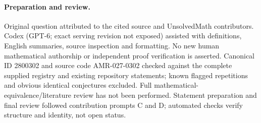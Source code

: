 \documentclass[11pt]{article}
\begin{document}
\paragraph{Preparation and review.}
Original question attributed to the cited source and UnsolvedMath contributors. Codex (GPT-6; exact serving revision not exposed) assisted with definitions, English summaries, source inspection and formatting. No new human mathematical authorship or independent proof verification is asserted. Canonical ID 2800302 and source code AMR-027-0302 checked against the complete supplied registry and existing repository statements; known flagged repetitions and obvious identical conjectures excluded. Full mathematical-equivalence/literature review has not been performed. Statement preparation and final review followed contribution prompts C and D; automated checks verify structure and identity, not open status.
\label{end:2800302}
\end{document}
